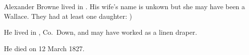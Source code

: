 
Alexander Browne lived in . His wife's name is unkown but she may have been a Wallace. They had at least one daughter: )

He lived in , Co.\ Down, and may have worked as a linen draper.

He died on 12 March 1827.

